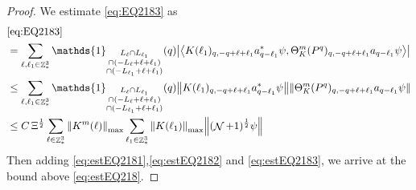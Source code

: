 \documentclass[sn-mathphys, Numbered ,a4paper]{sn-jnl}%
\DeclareMathOperator{\Z}{\mathbb{Z}}
\DeclareMathOperator{\NN}{\mathcal{N}}
\newcommand{\half}{\frac{1}{2}}
\newcommand{\eva}[1]{\left\langle #1 \right\rangle}
\theoremstyle{plain}
\theoremstyle{definition}
\theoremstyle{remark}
\theoremstyle{plain}
\theoremstyle{definition}
\theoremstyle{remark}
\begin{document}
\begin{proof}
We estimate \eqref{eq:EQ2183} as
\begin{align}
	& \eqref{eq:EQ2183}\nonumber\\
	&= \sum\limits_{\ell, \ell_1\in \Z^3_*} \mathds{1}_{\substack{L_{\ell}\cap L_{\ell_1}\\\cap (-L_{\ell}+\ell+\ell_1) \\ \cap (-L_{\ell_1}+\ell+\ell_1)}} (q) \abs{\eva{K(\ell_1)_{q,-q+\ell+\ell_1} a^*_{q-\ell_1} \psi, \Theta^m_{K}(P^q)_{q,-q+\ell+\ell_1} a_{q-\ell_1}\psi }}\nonumber\\
	&\leq \sum\limits_{\ell, \ell_1\in \Z^3_*} \mathds{1}_{\substack{L_{\ell}\cap L_{\ell_1}\\\cap (-L_{\ell}+\ell+\ell_1) \\ \cap (-L_{\ell_1}+\ell+\ell_1)}} (q) \norm{K(\ell_1)_{q,-q+\ell+\ell_1} a^*_{q-\ell_1} \psi}\norm{ \Theta^m_{K}(P^q)_{q,-q+\ell+\ell_1} a_{q-\ell_1}\psi }\nonumber\\
	&\leq C\,\Xi^\half \sum\limits_{\ell \in \Z^3_*} \norm{K^m(\ell)}_{\mathrm{max}} \sum\limits_{\ell_1 \in \Z^3_*} \norm{K(\ell_1)}_{\mathrm{max}}   \norm{  (\NN+1)^\half \psi}\label{eq:estEQ2183}
\end{align} 
Then adding \eqref{eq:estEQ2181},\eqref{eq:estEQ2182} and \eqref{eq:estEQ2183}, we arrive at the bound above \eqref{eq:estEQ218}. 
\end{proof}
\end{document}

